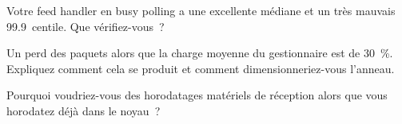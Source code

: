 \begin{interviewq}\label{iq:nw:network-cards-and-kernel-bypass:4}
Votre feed handler en busy polling a une excellente médiane et un très mauvais 99.9~centile. Que vérifiez-vous~?
\end{interviewq}

\begin{interviewq}\label{iq:nw:network-cards-and-kernel-bypass:5}
Un  perd des paquets alors que la charge moyenne du gestionnaire est de 30~\%. Expliquez comment cela se produit et comment dimensionneriez-vous l'anneau.
\end{interviewq}

\begin{interviewq}\label{iq:nw:network-cards-and-kernel-bypass:6}
Pourquoi voudriez-vous des horodatages matériels de réception alors que vous horodatez déjà dans le noyau~?
\end{interviewq}
